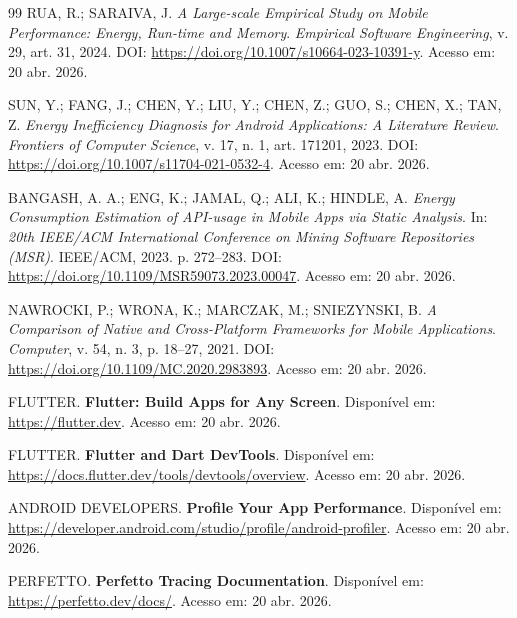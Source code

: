 \begin{thebibliography}{99}
RUA, R.; SARAIVA, J.
\newblock \textit{A Large-scale Empirical Study on Mobile Performance: Energy, Run-time and Memory}.
\newblock \emph{Empirical Software Engineering}, v. 29, art. 31, 2024.
\newblock DOI: \url{https://doi.org/10.1007/s10664-023-10391-y}.
\newblock Acesso em: 20 abr. 2026.

SUN, Y.; FANG, J.; CHEN, Y.; LIU, Y.; CHEN, Z.; GUO, S.; CHEN, X.; TAN, Z.
\newblock \textit{Energy Inefficiency Diagnosis for Android Applications: A Literature Review}.
\newblock \emph{Frontiers of Computer Science}, v. 17, n. 1, art. 171201, 2023.
\newblock DOI: \url{https://doi.org/10.1007/s11704-021-0532-4}.
\newblock Acesso em: 20 abr. 2026.

BANGASH, A. A.; ENG, K.; JAMAL, Q.; ALI, K.; HINDLE, A.
\newblock \textit{Energy Consumption Estimation of API-usage in Mobile Apps via Static Analysis}.
\newblock In: \emph{20th IEEE/ACM International Conference on Mining Software Repositories (MSR)}.
\newblock IEEE/ACM, 2023. p. 272--283.
\newblock DOI: \url{https://doi.org/10.1109/MSR59073.2023.00047}.
\newblock Acesso em: 20 abr. 2026.

NAWROCKI, P.; WRONA, K.; MARCZAK, M.; SNIEZYNSKI, B.
\newblock \textit{A Comparison of Native and Cross-Platform Frameworks for Mobile Applications}.
\newblock \emph{Computer}, v. 54, n. 3, p. 18--27, 2021.
\newblock DOI: \url{https://doi.org/10.1109/MC.2020.2983893}.
\newblock Acesso em: 20 abr. 2026.


FLUTTER.
\newblock \textbf{Flutter: Build Apps for Any Screen}.
\newblock Disponível em: \url{https://flutter.dev}.
\newblock Acesso em: 20 abr. 2026.

FLUTTER.
\newblock \textbf{Flutter and Dart DevTools}.
\newblock Disponível em: \url{https://docs.flutter.dev/tools/devtools/overview}.
\newblock Acesso em: 20 abr. 2026.

ANDROID DEVELOPERS.
\newblock \textbf{Profile Your App Performance}.
\newblock Disponível em: \url{https://developer.android.com/studio/profile/android-profiler}.
\newblock Acesso em: 20 abr. 2026.

PERFETTO.
\newblock \textbf{Perfetto Tracing Documentation}.
\newblock Disponível em: \url{https://perfetto.dev/docs/}.
\newblock Acesso em: 20 abr. 2026.


\end{thebibliography}
